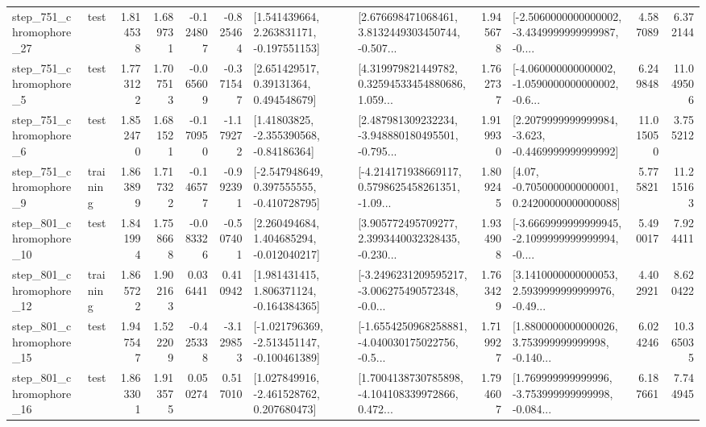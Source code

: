\begin{tabular}{llrrrrllrlrr}
  step\_751\_chromophore\_27 &      test &      1.814538 &    1.689731 &     -0.124807 & -0.825464 &    [1.541439664, 2.263831171, -0.197551153] &  [2.676698471068461, 3.8132449303450744, -0.507... &       1.945678 &  [-2.5060000000000002, -3.4349999999999987, -0.... &            4.587089 &          6.372144 \\
   step\_751\_chromophore\_5 &      test &      1.773122 &    1.707513 &     -0.065609 & -0.371547 &      [2.651429517, 0.39131364, 0.494548679] &  [4.319979821449782, 0.32594533454880686, 1.059... &       1.762737 &  [-4.060000000000002, -1.0590000000000002, -0.6... &            6.249848 &         11.049506 \\
   step\_751\_chromophore\_6 &      test &      1.852470 &    1.681521 &     -0.170950 & -1.179272 &     [1.41803825, -2.355390568, -0.84186364] &  [2.487981309232234, -3.948880180495501, -0.795... &       1.919930 &  [2.2079999999999984, -3.623, -0.4469999999999992] &           11.015050 &          3.755212 \\
   step\_751\_chromophore\_9 &  training &      1.863899 &    1.717322 &     -0.146577 & -0.992391 &   [-2.547948649, 0.397555555, -0.410728795] &  [-4.214171938669117, 0.5798625458261351, -1.09... &       1.809245 &   [4.07, -0.7050000000000001, 0.24200000000000088] &            5.775821 &         11.215163 \\
  step\_801\_chromophore\_10 &      test &      1.841994 &    1.758668 &     -0.083326 & -0.507401 &    [2.260494684, 1.404685294, -0.012040217] &  [3.905772495709277, 2.3993440032328435, -0.230... &       1.934908 &  [-3.6669999999999945, -2.1099999999999994, -0.... &            5.490017 &          7.924411 \\
  step\_801\_chromophore\_12 &  training &      1.865722 &    1.902163 &      0.036441 &  0.410942 &    [1.981431415, 1.806371124, -0.164384365] &  [-3.2496231209595217, -3.006275490572348, -0.0... &       1.763429 &  [3.1410000000000053, 2.5939999999999976, -0.49... &            4.402921 &          8.620422 \\
  step\_801\_chromophore\_15 &      test &      1.947547 &    1.522209 &     -0.425338 & -3.129853 &  [-1.021796369, -2.513451147, -0.100461389] &  [-1.6554250968258881, -4.040030175022756, -0.5... &       1.719927 &  [1.8800000000000026, 3.753999999999998, -0.140... &            6.024246 &         10.365035 \\
  step\_801\_chromophore\_16 &      test &      1.863301 &    1.913575 &      0.050274 &  0.517010 &    [1.027849916, -2.461528762, 0.207680473] &  [1.7004138730785898, -4.104108339972866, 0.472... &       1.794607 &  [1.769999999999996, -3.753999999999998, -0.084... &            6.187661 &          7.744945 \\

\end{tabular}
